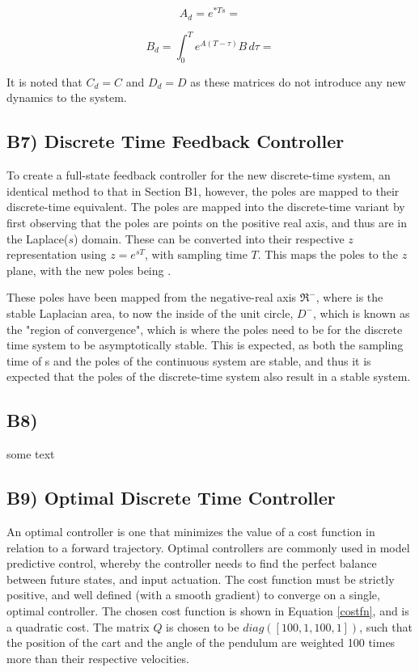 \documentclass{article}
\begin{document}
\begin{equation}\label{ad}
    A_d=e^{*Ts}=
\end{equation}


\begin{equation}\label{Bd}
    B_d=\int_{0}^{T} e^{A(T - \tau)} B \, d\tau=
\end{equation}

It is noted that $C_d=C$ and $D_d=D$ as these matrices do not introduce any new dynamics to the system.



\subsection*{B7) Discrete Time Feedback Controller}
To create a full-state feedback controller for the new discrete-time system, an identical method to that in Section B1, however, the poles are mapped to their discrete-time equivalent. The poles are mapped into the discrete-time variant by first observing that the poles are points on the positive real axis, and thus are in the Laplace($s$) domain. These can be converted into their respective $z$ representation using $z=e^{sT}$, with sampling time $T$. This maps the poles to the $z$ plane, with the new poles being . 
\newline

These poles have been mapped from the negative-real axis $\Re^-$, where is the stable Laplacian area, to now the inside of the unit circle, $D^-$, which is known as the "region of convergence", which is where the poles need to be for the discrete time system to be asymptotically stable. This is expected, as both the sampling time of s and 
the poles of the continuous system are stable, and thus it is expected that the poles of the discrete-time system also result in a stable system. 




\subsection*{B8) }
some text


\subsection*{B9) Optimal Discrete Time Controller}
An optimal controller is one that minimizes the value of a cost function in relation to a forward trajectory. Optimal controllers are commonly used in model predictive control, whereby the controller needs to find the perfect balance between future states, and input actuation. The cost function must be strictly positive, and well defined (with a smooth gradient) to converge on a single, optimal controller. The chosen cost function is shown in Equation \ref{costfn}, and is a quadratic cost. The matrix $Q$ is chosen to be $diag([100, 1, 100, 1])$, such that the position of the cart and the angle of the pendulum are weighted 100 times more than their respective velocities.
\end{document}

